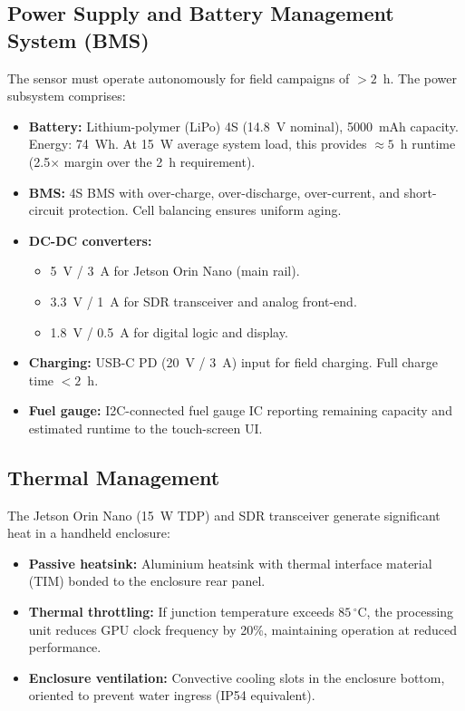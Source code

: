 \documentclass[11pt,a4paper]{article}
\begin{document}
\subsection{Power Supply and Battery Management System (BMS)}

The sensor must operate autonomously for field campaigns of $> 2$~h. The power subsystem comprises:

\begin{itemize}
    \item \textbf{Battery:} Lithium-polymer (LiPo) 4S (14.8~V nominal), 5000~mAh capacity. Energy: 74~Wh. At 15~W average system load, this provides $\approx 5$~h runtime (2.5$\times$ margin over the 2~h requirement).
    \item \textbf{BMS:} 4S BMS with over-charge, over-discharge, over-current, and short-circuit protection. Cell balancing ensures uniform aging.
    \item \textbf{DC-DC converters:} 
        \begin{itemize}
            \item 5~V / 3~A for Jetson Orin Nano (main rail).
            \item 3.3~V / 1~A for SDR transceiver and analog front-end.
            \item 1.8~V / 0.5~A for digital logic and display.
        \end{itemize}
    \item \textbf{Charging:} USB-C PD (20~V / 3~A) input for field charging. Full charge time $< 2$~h.
    \item \textbf{Fuel gauge:} I2C-connected fuel gauge IC reporting remaining capacity and estimated runtime to the touch-screen UI.
\end{itemize}

\subsection{Thermal Management}

The Jetson Orin Nano (15~W TDP) and SDR transceiver generate significant heat in a handheld enclosure:

\begin{itemize}
    \item \textbf{Passive heatsink:} Aluminium heatsink with thermal interface material (TIM) bonded to the enclosure rear panel.
    \item \textbf{Thermal throttling:} If junction temperature exceeds $85\,^{\circ}$C, the processing unit reduces GPU clock frequency by 20\%, maintaining operation at reduced performance.
    \item \textbf{Enclosure ventilation:} Convective cooling slots in the enclosure bottom, oriented to prevent water ingress (IP54 equivalent).
\end{itemize}
\end{document}
